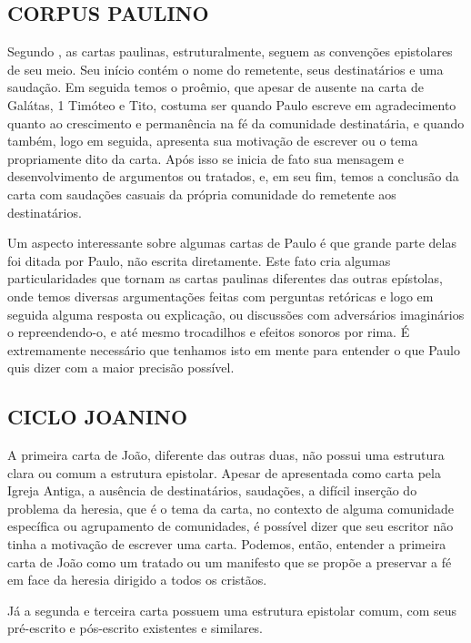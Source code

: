 \documentclass[
    article,            %
	12pt,				%
	oneside,			%
	a4paper,			%
	chapter=TITLE,		%
	section=TITLE,		%
	english,			%
	french,				%
	spanish,			%
	brazil				%
	]{abntex2}
\begin{document}
\subsection{CORPUS PAULINO}
Segundo , as cartas paulinas, estruturalmente, seguem as convenções epistolares de seu meio. Seu início contém o nome do remetente, seus destinatários e uma saudação. Em seguida temos o proêmio, que apesar de ausente na carta de Galátas, 1 Timóteo e Tito, costuma ser quando Paulo escreve em agradecimento quanto ao crescimento e permanência na fé da comunidade destinatária, e quando também, logo em seguida, apresenta sua motivação de escrever ou o tema propriamente dito da carta. Após isso se inicia de fato sua mensagem e desenvolvimento de argumentos ou tratados, e, em seu fim, temos a conclusão da carta com saudações casuais da própria comunidade do remetente aos destinatários.

Um aspecto interessante sobre algumas cartas de Paulo é que grande parte delas foi ditada por Paulo, não escrita diretamente. Este fato cria algumas particularidades que tornam as cartas paulinas diferentes das outras epístolas, onde temos diversas argumentações feitas com perguntas retóricas e logo em seguida alguma resposta ou explicação, ou discussões com adversários imaginários o repreendendo-o, e até mesmo trocadilhos e efeitos sonoros por rima. É extremamente necessário que tenhamos isto em mente para entender o que Paulo quis dizer com a maior precisão possível.

\subsection{CICLO JOANINO}
A primeira carta de João, diferente das outras duas, não possui uma estrutura clara ou comum a estrutura epistolar. Apesar de apresentada como carta pela Igreja Antiga, a ausência de destinatários, saudações, a difícil inserção do problema da heresia, que é o tema da carta, no contexto de alguma comunidade específica ou agrupamento de comunidades, é possível dizer que seu escritor não tinha a motivação de escrever uma carta. Podemos, então, entender a primeira carta de João como um tratado ou um manifesto que se propõe a preservar a fé em face da heresia dirigido a todos os cristãos.

Já a segunda e terceira carta possuem uma estrutura epistolar comum, com seus pré-escrito e pós-escrito existentes e similares.
\end{document}

